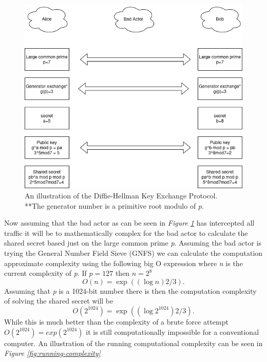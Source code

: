 \documentclass[12pt]{article}
\begin{document}
\begin{figure}
  \centering
  \includegraphics[width=\textwidth]{diffiehellman.drawio.png}
  \caption{An illustration of the Diffie-Hellman Key Exchange Protocol. \\**The generator number is a primitive root modulo of \textit{p}.}
  \label{fig:diffie-hellman}
\end{figure}

\newpage

Now assuming that the bad actor as can be seen in \textit{Figure \ref{fig:diffie-hellman}} has intercepted
all traffic it will be to mathematically complex for the bad actor to calculate the shared secret 
based just on the large common prime \textit{p}. Assuming the bad actor is trying the 
General Number Field Sieve (GNFS) we can calculate the computation approximate complexity using the following
big O expression where \textit{n} is the current complexity of \textit{p}. If $p=127$ then $n=2^8$
\[
O(n)=\exp((\log n){2/3}).
\]
Assuming that \textit{p} is a 1024-bit number there is 
then the computation complexity of solving the shared secret will be 
\[
O(2^{1024})=\exp((\log 2^{1024}){2/3}).
\]
While this is much better than the complexity of a brute force attempt $O(2^{1024})=exp(2^{1024})$
it is still computationally impossible for a conventional computer.
An illustration of the running computational complexity can be seen in \textit{Figure \ref{fig:running-complexity}}

\newpage
\end{document}
